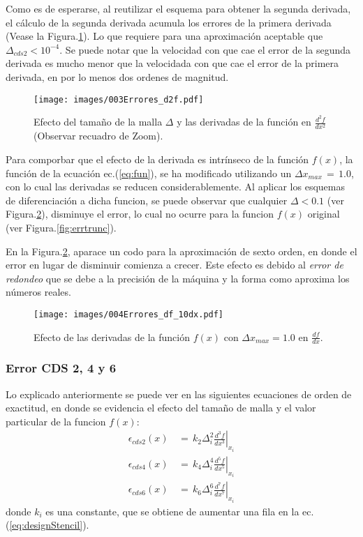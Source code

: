 \documentclass[9pt,technote,twoside,letterpaper,onecolumn]{IEEEtran}
\begin{document}
\begin{multicols}{2}
Como es de esperarse, al reutilizar el esquema para obtener la segunda derivada, el cálculo de la segunda derivada acumula los errores de la primera derivada (Vease la Figura.\ref{fig:err2trunc}). Lo que requiere para una aproximación aceptable que $\Delta_{cds2}<10^{-4}$. Se puede notar que la velocidad con que cae el error de la segunda derivada es mucho menor que la velocidada con que cae el error de la primera derivada, en por lo menos dos ordenes de magnitud.

\begin{figure}[H]
  \centering
  \texttt{[image: images/003Errores\_d2f.pdf]}
  \caption{Efecto del tamaño de la malla $\Delta$ y las derivadas de la función en $\frac{d^2f}{dx^2}$ (Observar recuadro de Zoom).}
  \label{fig:err2trunc}
\end{figure}

Para comporbar que el efecto de la derivada es intrínseco de la función $f(x)$, la función de la ecuación ec.(\ref{eq:fun}), se ha modificado utilizando un $\Delta x_{max}\,=\,1.0$, con lo cual las derivadas se reducen considerablemente. Al aplicar los esquemas de diferenciación a dicha funcion, se puede observar que cualquier $\Delta<0.1$ (ver Figura.\ref{fig:errdxOthertrunc}), disminuye el error, lo cual no ocurre para la funcion $f(x)$ original (ver Figura.\ref{fig:errtrunc}).

En la Figura.\ref{fig:errdxOthertrunc}, aparace un codo para la aproximación de sexto orden, en donde el error en lugar de disminuir comienza a crecer. Este efecto es debido al \emph{error de redondeo} que se debe a la precisión de la máquina y la forma como aproxima los números reales.

\begin{figure}[H]
  \centering
  \texttt{[image: images/004Errores\_df\_10dx.pdf]}
  \caption{Efecto de las derivadas de la función $f(x)$ con $\Delta x_{max}=1.0$ en $\frac{df}{dx}$.}
  \label{fig:errdxOthertrunc}
\end{figure}

\subsubsection{Error CDS 2, 4 y 6}
\label{sec:errcds4}
Lo explicado anteriormente se puede ver en las siguientes ecuaciones de orden de exactitud, en donde se evidencia el efecto del tamaño de malla y el valor particular de la funcion $f(x)$:
\begin{align}
  \epsilon_{cds2}(x)\,&=\,k_2\Delta_i^2\left.\frac{d^3f}{dx^3}\right|_{x_i}
  \label{eq:errcds2}\\
  \epsilon_{cds4}(x)\,&=\,k_4\Delta_i^4\left.\frac{d^5f}{dx^5}\right|_{x_i}
  \label{eq:errcds4}\\
  \epsilon_{cds6}(x)\,&=\,k_6\Delta_i^6\left.\frac{d^7f}{dx^7}\right|_{x_i}
  \label{eq:errcds6}
\end{align}
donde $k_i$ es una constante, que se obtiene de aumentar una fila en la ec.(\ref{eq:designStencil}).


\end{multicols}
\end{document}
